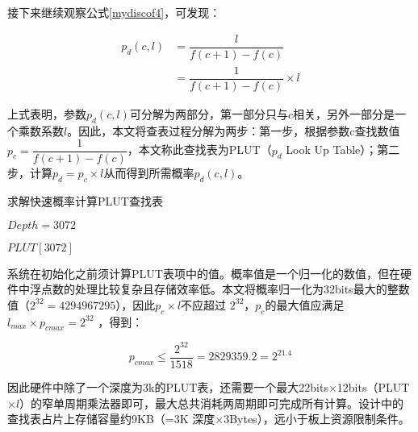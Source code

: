 接下来继续观察公式\ref{mydiscof4}，可发现：

\begin{align}\label{mydiscof5}
p_d(c,l) &= \dfrac{l}{f(c+1)-f(c)}   \nonumber \\
&= \dfrac{1}{f(c+1)-f(c)} \times l 
\end{align}

上式表明，参数$ p_d(c,l) $可分解为两部分，第一部分只与$ c $相关，另外一部分是一个乘数系数$l$。因此，本文将查表过程分解为两步：第一步，根据参数c查找数值$ p_c= \dfrac{1}{f(c+1)-f(c)} $，本文称此查找表为PLUT（$p_d$ Look Up Table）；第二步，计算$ p_d = p_c \times l $从而得到所需概率$ p_d(c,l) $。

\begin{algorithm}[ht]
	\caption{求解快速概率计算PLUT查找表  \label{mydiscoa3}}
	\IncMargin{2em}
	\DontPrintSemicolon
	$Depth = 3072 $ 
	
	$ PLUT[3072] $
	
\end{algorithm}



系统在初始化之前须计算PLUT表项中的值。概率值是一个归一化的数值，但在硬件中浮点数的处理比较复杂且存储效率低。本文将概率归一化为32bits最大的整数值（$2^{32}=4294967295$），因此$ p_c \times l  $不应超过 $ 2^{32} $，$ p_c $的最大值应满足$ l_{max} \times p_{cmax} = 2^{32 } $ ，得到：

\begin{equation} \label{mydiscof6}
p_{cmax} \leq \dfrac{2^{32}}{1518} =2829359.2=2^{21.4}
\end{equation}



因此硬件中除了一个深度为3k的PLUT表，还需要一个最大22bits$\times$12bits（PLUT$\times l$）的窄单周期乘法器即可，最大总共消耗两周期即可完成所有计算。设计中的查找表占片上存储容量约9KB（=3K 深度$\times$3Bytes），远小于板上资源限制条件。


